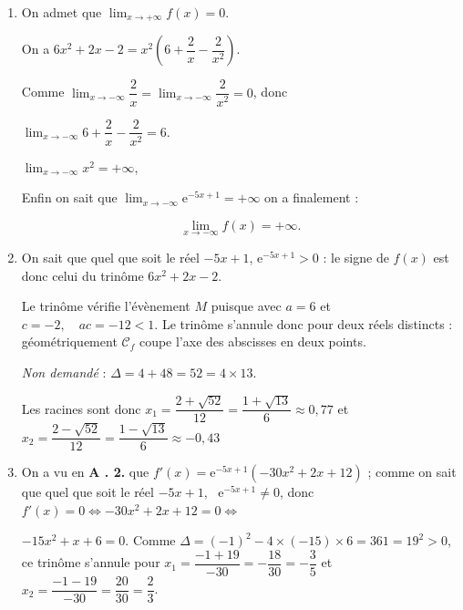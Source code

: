 \documentclass[10pt]{article}
\providecommand{\e}{{\mathrm{e}}}
\begin{document}
\medskip

\begin{enumerate}
\item On admet que $\displaystyle\lim_{x \to + \infty} f(x) = 0$.


On a $6x^2 + 2x - 2 = x^2\left(6 + \dfrac{2}{x} - \dfrac{2}{x^2} \right)$.

Comme $\displaystyle\lim_{x \to - \infty} \dfrac{2}{x} = \displaystyle\lim_{x \to - \infty}\dfrac{2}{x^2} = 0$, donc 

$\displaystyle\lim_{x \to - \infty}6 + \dfrac{2}{x} - \dfrac{2}{x^2} = 6$.

$\displaystyle\lim_{x \to - \infty} x^2 = + \infty$, 

Enfin on sait que $\displaystyle\lim_{x \to - \infty}\e^{-5x+ 1} = + \infty$ on a finalement :

\[\displaystyle\lim_{x \to - \infty}f(x) = + \infty.\]
\item 
On sait que quel que soit le réel $- 5x + 1$, \: \: $\e^{- 5x + 1} > 0$ : le signe de $f(x)$ est donc celui du trinôme $6x^2 + 2x - 2$.

Le trinôme vérifie l'évènement $M$ puisque avec $a = 6$ et $c = - 2, \quad ac= - 12 < 1$.
Le trinôme s'annule donc pour deux réels distincts : géométriquement $\mathcal{C}_f$ coupe l'axe des abscisses en deux points.

\emph{Non demandé} : $\Delta = 4 + 48 = 52 = 4 \times 13$.

Les racines sont donc $x_1 = \dfrac{2+ \sqrt{52}}{12} = \dfrac{1 + \sqrt{13}}{6} \approx 0,77$ et $x_2 = \dfrac{2 - \sqrt{52}}{12} = \dfrac{1 - \sqrt{13}}{6} \approx - 0,43$
\item 
On a vu en \textbf{A . 2.} que $f'(x) = \e^{-5x+ 1}\left(-30x^2 + 2x + 12\right)$ ; comme on sait que quel que soit le réel $-5x + 1,\:\: \: \e^{-5x+ 1} \ne 0$, donc $f'(x) = 0 \iff -30x^2 + 2x + 12 = 0 \iff$

$- 15x^2 + x + 6 = 0$. Comme $\Delta = (-1)^2 - 4 \times (- 15) \times 6 = 361 = 19^2 > 0$, ce trinôme s'annule pour $x_1 = \dfrac{- 1 + 19}{- 30} = -\dfrac{18}{30} = -\dfrac35$ et $x_2 = \dfrac{- 1 - 19}{- 30} = \dfrac{20}{30} = \dfrac23$.


\end{enumerate}
\end{document}
